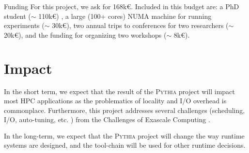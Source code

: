 \documentclass[a4paper,11pt,defblank]{article}
\newcommand{\pname}{\textsc{Pythia}\xspace}
\begin{document}
\begin{paragraph}{Funding}
  For this project, we ask for 168k{\euro}. Included in this budget
  are: a PhD student ($\sim$ 110k\euro) , a large (100+ cores) NUMA
  machine for running experiments ($\sim$ 30k\euro),
  two annual trips to conferences for two researchers ($\sim$
  20k\euro), and the funding for organizing two workshops ($\sim$
  8k\euro).
\end{paragraph}

\section{Impact}


In the short term, we expect that the result of the \pname project
will impact most HPC applications as the problematics of locality and
I/O overhead is commonplace.
%
Furthermore, this project addresses several challenges (scheduling,
I/O, auto-tuning, etc. ) from the Challenges of Exascale Computing
\cite{exascale_challenges}.

In the long-term, we expect that the \pname project will change the
way runtime systems are designed, and the tool-chain will be used for
other runtime decisions.


\end{document}
